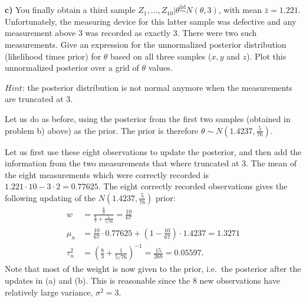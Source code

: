 \documentclass[
  letterpaper,
  DIV=11,
  numbers=noendperiod]{scrartcl}
\begin{document}
\textbf{c)} You finally obtain a third sample
\(Z_{1},\ldots,Z_{10} | \theta \overset{\mathrm{iid}}{\sim} N(\theta,3)\),
with mean \(\bar{z}=1.221\). Unfortunately, the measuring device for
this latter sample was defective and any measurement above \(3\) was
recorded as exactly \(3\). There were two such measurements. Give an
expression for the unnormalized posterior distribution (likelihood times
prior) for \(\theta\) based on all three samples (\(x,y\) and \(z\)).
Plot this unnormalized posterior over a grid of \(\theta\) values.

\(\textit{Hint}\): the posterior distribution is not normal anymore when
the measurements are truncated at \(3\).

\begin{tcolorbox}[enhanced jigsaw, coltitle=black, breakable, colbacktitle=quarto-callout-note-color!10!white, colframe=quarto-callout-note-color-frame, bottomrule=.15mm, toprule=.15mm, rightrule=.15mm, arc=.35mm, colback=white, opacityback=0, bottomtitle=1mm, leftrule=.75mm, title={Solution}, titlerule=0mm, toptitle=1mm, left=2mm, opacitybacktitle=0.6]

Let us do as before, using the posterior from the first two samples
(obtained in problem b) above) as the prior. The prior is therefore
\(\theta\sim N\left(1.4237,\frac{5}{76}\right)\).

Let us first use these eight observations to update the posterior, and
then add the information from the two measurements that where truncated
at \(3\). The mean of the eight measurements which were correctly
recorded is \(1.221\cdot10-3\cdot2=0.77625\). The eight correctly
recorded observations gives the following updating of the
\(N\left(1.4237,\frac{5}{76}\right)\) prior: \begin{align*}
      w &=\frac{\frac{8}{3}}{\frac{8}{3}+\frac{1}{5/76}}=\frac{10}{67} \\
      \mu_{n}   &=\frac{10}{67}\cdot0.77625+\left(1-\frac{10}{67}\right)\cdot1.4237=1.3271 \\
      \tau_{n}^{2} &=\left(\frac{8}{3}+\frac{1}{5/76}\right)^{-1}=\frac{15}{268}=0.05597.
    \end{align*} Note that most of the weight is now given to the prior,
i.e.~the posterior after the updates in (a) and (b). This is reasonable
since the \(8\) new observations have relatively large variance,
\(\sigma^{2}=3\).


\end{tcolorbox}
\end{document}
